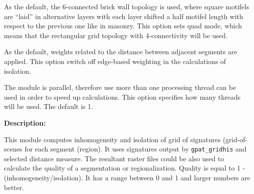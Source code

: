 
As the default, the 6-connected brick wall topology is used, where square motifels are “laid” in alternative layers with each layer shifted a half motifel length with respect to the previous one like in masonry. 
This option sets quad mode, which means that the rectangular grid topology with 4-connectivity will be used. 


As the default, weights related to the distance between adjacent segments are applied.
This option switch off edge-based weighting in the calculations of isolation.


The module is parallel, therefore use more than one processing thread can be used in order to speed up calculations. 
This option specifies how many threads will be used. 
The default is 1.

{\bf Description:}

This module computes inhomogeneity and isolation of grid of signatures (grid-of-scenes for each segment (region).
It uses signatures output by {\tt gpat\_gridhis} and selected distance measure.
The resultant raster files could be also used to calculate the quality of a segmentation or regionalization. 
Quality is equal to 1 - (inhomogeneity/isolation).
It has a range between 0 and 1 and larger numbers are better. 
